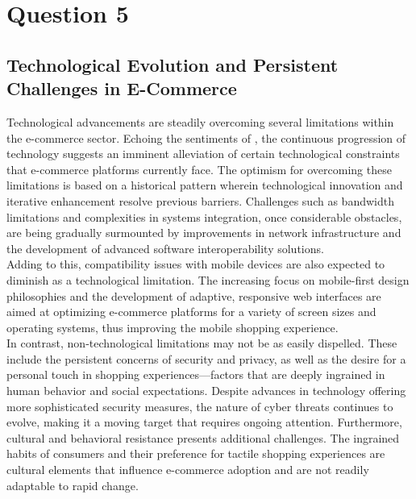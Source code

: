 \documentclass[12pt,a4paper]{article}
\begin{document}
\pagebreak


\setcounter{page}{7}
\section{Question 5}
\subsection{Technological Evolution and Persistent Challenges in E-Commerce}
\label{sec:Question 5}
Technological advancements are steadily overcoming several limitations within the e-commerce sector. Echoing the sentiments of \citep{Ref1.4}, the continuous progression of technology suggests an imminent alleviation of certain technological constraints that e-commerce platforms currently face. The optimism for overcoming these limitations is based on a historical pattern wherein technological innovation and iterative enhancement resolve previous barriers. Challenges such as bandwidth limitations and complexities in systems integration, once considerable obstacles, are being gradually surmounted by improvements in network infrastructure and the development of advanced software interoperability solutions.\\

\noindent Adding to this, compatibility issues with mobile devices are also expected to diminish as a technological limitation. The increasing focus on mobile-first design philosophies and the development of adaptive, responsive web interfaces are aimed at optimizing e-commerce platforms for a variety of screen sizes and operating systems, thus improving the mobile shopping experience.\\

\noindent In contrast, non-technological limitations may not be as easily dispelled. These include the persistent concerns of security and privacy, as well as the desire for a personal touch in shopping experiences—factors that are deeply ingrained in human behavior and social expectations. Despite advances in technology offering more sophisticated security measures, the nature of cyber threats continues to evolve, making it a moving target that requires ongoing attention. Furthermore, cultural and behavioral resistance presents additional challenges. The ingrained habits of consumers and their preference for tactile shopping experiences are cultural elements that influence e-commerce adoption and are not readily adaptable to rapid change. \\
  
\end{document}

